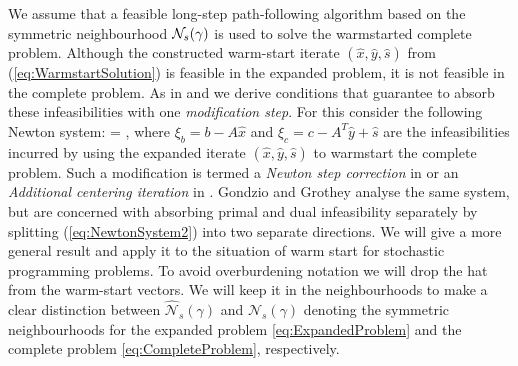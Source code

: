 We assume that a feasible long-step path-following algorithm based on
the symmetric neighbourhood $\mathcal{N}_s(\gamma)$ 
is used to solve the warmstarted complete problem. 
Although the constructed warm-start iterate $(\hat{x}, \hat{y}, \hat{s})$ 
from (\ref{eq:WarmstartSolution}) is feasible in the expanded problem, 
it is not feasible in the complete problem. 
As in \cite{YildirimWright} and \cite{GondzioGrothey03} we derive
conditions that guarantee to absorb these infeasibilities with one
{\em modification step}. 
For this consider the following Newton system:
\be \label{eq:NewtonSystem2}
 = 
\left[ \begin{array}{c}
    \xi_b \\ \xi_c \\ 0
  \end{array} \right],
\ee
where $\xi_b = b - A\hat{x}$ and $\xi_c = c - A^T\hat{y}+\hat{s}$ are the
infeasibilities incurred by using the expanded iterate $(\hat{x},
\hat{y}, \hat{s})$ to warmstart the complete problem. 
Such a modification is termed a {\em Newton step correction} in
\cite{YildirimWright} or an {\em Additional centering iteration}
in \cite{GondzioGrothey06}. 
Gondzio and Grothey \cite{GondzioGrothey03} analyse the
same system, but are concerned with absorbing primal and dual
infeasibility separately by splitting (\ref{eq:NewtonSystem2}) into
two separate directions.
We will give a more general result and apply it to the situation of
warm start for stochastic programming problems. To avoid overburdening
notation we will drop the hat from the warm-start vectors.
We will keep it in the neighbourhoods to make a clear distinction between
$\widehat{\mathcal{N}}_s(\gamma)$ and $\mathcal{N}_s(\gamma)$
denoting the symmetric neighbourhoods 
for the expanded problem \eqref{eq:ExpandedProblem}
and the complete problem \eqref{eq:CompleteProblem}, respectively.

